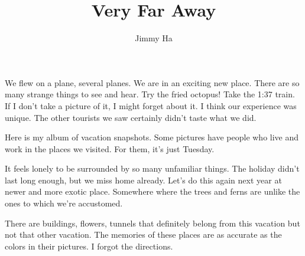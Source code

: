 \documentclass[14pt, letterpaper]{extarticle}
\begin{document}
 \title{\LARGE{Very Far Away}}
 \author{\normalsize{Jimmy Ha}}
 \date{}
  
\maketitle

We flew on a plane, several planes. We are in an exciting new place. There are so many strange things to see and hear. Try the fried octopus! Take the 1:37 train.  If I don't take a picture of it, I might forget about it. I think our experience was unique. The other tourists we saw certainly didn't taste what we did. 

\vspace{1\baselineskip}
Here is my album of vacation snapshots. Some pictures have people who live and work in the places we visited. For them, it's just Tuesday.  

\vspace{1\baselineskip}
It feels lonely to be surrounded by so many unfamiliar things. The holiday didn't last long enough, but we miss home already. Let's do this again next year at newer and more exotic place. Somewhere where the trees and ferns are unlike the ones to which we're accustomed.

\vspace{1\baselineskip}
There are  buildings, flowers, tunnels that definitely belong from this vacation but not that other vacation. The memories of these places are as accurate as the colors in their pictures. I forgot the directions.




  
  
\end{document}
